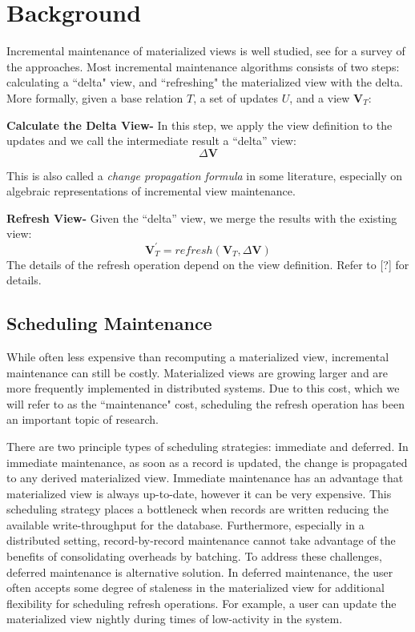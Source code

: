 \section{Background}
Incremental maintenance of materialized views is well studied, see \cite{chirkova2011materialized} for a survey of the approaches. 
Most incremental maintenance algorithms consists of two steps: calculating a ``delta" view,
and ``refreshing" the materialized view with the delta.
More formally, given a base relation $T$, a set of updates $U$,
and a view $\textbf{V}_{T}$:

\textbf{Calculate the Delta View- }
In this step, we apply the view definition to the updates and we call
the intermediate result a ``delta'' view:
\[
\Delta\textbf{V}
\]

This is also called a \emph{change propagation formula} in some literature,
especially on algebraic representations of incremental view maintenance.

\textbf{Refresh View- }
Given the ``delta'' view, we merge the results with the existing
view:
\[
\textbf{V}_{T}^{'}=refresh(\textbf{V}_{T},\Delta\textbf{V})
\] 
The details of the refresh operation depend on the view definition.
Refer to [?] for details.


\subsection{Scheduling Maintenance}
While often less expensive than recomputing a materialized view,
incremental maintenance can still be costly.
Materialized views are growing larger and are more frequently 
implemented in distributed systems.
Due to this cost, which we will refer to as the ``maintenance" cost, 
scheduling the refresh operation has been an important topic of research.

There are two principle types of scheduling strategies: immediate and deferred. 
In immediate maintenance, as soon as a record is updated, 
the change is propagated to any derived materialized view.
Immediate maintenance has an advantage that materialized view is always up-to-date, 
however it can be very expensive.
This scheduling strategy places a bottleneck when records are written reducing 
the available write-throughput for the database.
Furthermore, especially in a distributed setting, record-by-record 
maintenance cannot take advantage of the benefits of consolidating overheads by batching.
To address these challenges, deferred maintenance is alternative solution.
In deferred maintenance, the user often accepts some degree of staleness in 
the materialized view for additional flexibility for scheduling refresh operations.
For example, a user can update the materialized view 
nightly during times of low-activity in the system.

